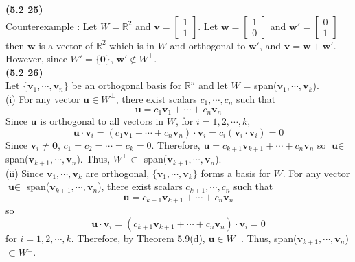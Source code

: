\textbf{(5.2 25)} \\
Counterexample : Let $W = \mathbb{R}^2$ and $\textbf{v} = \begin{bmatrix}
	1 \\ 1
\end{bmatrix}$. Let $\textbf{w} = \begin{bmatrix}
	1 \\ 0
\end{bmatrix}$ and $\textbf{w}' = \begin{bmatrix}
	0 \\ 1
\end{bmatrix}$ then $\textbf{w}$ is a vector of $\mathbb{R}^2$ which is in $W$ and orthogonal to $\textbf{w}'$, and $\textbf{v} = \textbf{w} + \textbf{w}'$. However, since $W' = \{ \textbf{0} \}$, $\textbf{w}' \notin W^\perp$. \\

\textbf{(5.2 26)} \\
Let $\{ \textbf{v}_1, \cdots, \textbf{v}_n \}$ be an orthogonal basis for $\mathbb{R}^n$ and let $W$ = span($\textbf{v}_1, \cdots, \textbf{v}_k$). \\

(i) For any vector $\textbf{u} \in W^\perp$, there exist scalars $c_1, \cdots, c_n$ such that \begin{equation*}
	\textbf{u} = c_1\textbf{v}_1 + \cdots + c_n\textbf{v}_n
\end{equation*} Since $\textbf{u}$ is orthogonal to all vectors in $W$, for $i = 1, 2, \cdots, k$, \begin{equation*}
	\textbf{u} \cdot \textbf{v}_i = (c_1\textbf{v}_1 + \cdots + c_n\textbf{v}_n) \cdot \textbf{v}_i = c_i(\textbf{v}_i \cdot \textbf{v}_i) = 0
\end{equation*} Since $\textbf{v}_i \neq \textbf{0}$, $c_1 = c_2 = \cdots = c_k = 0$. Therefore, $\textbf{u} = c_{k+1}\textbf{v}_{k+1} + \cdots + c_n\textbf{v}_n$ so $\textbf{u} \in $ span($\textbf{v}_{k+1}, \cdots, \textbf{v}_n$). Thus, $W^\perp \subset$ span($\textbf{v}_{k+1}, \cdots, \textbf{v}_n$). \\

(ii) Since $\textbf{v}_1, \cdots, \textbf{v}_k$ are orthogonal, $\{ \textbf{v}_1, \cdots, \textbf{v}_k \}$ forms a basis for $W$. For any vector $\textbf{u} \in$ span($\textbf{v}_{k+1}, \cdots, \textbf{v}_n$), there exist scalars $c_{k+1}, \cdots, c_n$ such that \begin{equation*}
	\textbf{u} = c_{k+1}\textbf{v}_{k+1} + \cdots + c_n\textbf{v}_n
\end{equation*} so \begin{equation*}
	\textbf{u} \cdot \textbf{v}_i = (c_{k+1}\textbf{v}_{k+1} + \cdots + c_n\textbf{v}_n) \cdot \textbf{v}_i = 0
\end{equation*} for $i = 1, 2, \cdots, k$. Therefore, by Theorem 5.9(d), $\textbf{u} \in W^\perp$. Thus, span($\textbf{v}_{k+1}, \cdots, \textbf{v}_n$) $\subset W^\perp$. \\

